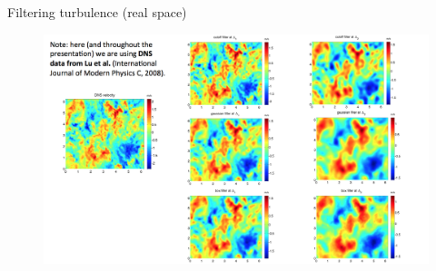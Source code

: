 \begin{frame}{Filtering turbulence (real space)}
\begin{figure}
	\includegraphics[width=1\textwidth]{filter_all.png}
\end{figure}
\end{frame}

